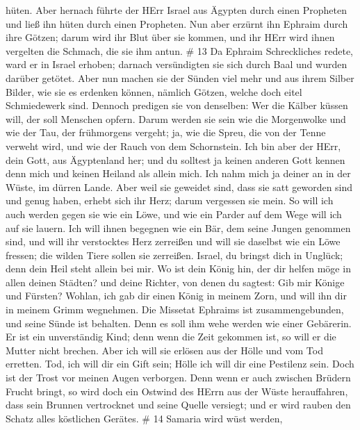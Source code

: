 hüten.  Aber hernach führte der HErr Israel aus Ägypten
durch einen Propheten und ließ ihn hüten durch einen Propheten.
 Nun aber erzürnt ihn Ephraim durch ihre Götzen; darum wird
ihr Blut über sie kommen, und ihr HErr wird ihnen vergelten die Schmach,
die sie ihm antun. \# 13  Da Ephraim Schreckliches redete,
ward er in Israel erhoben; darnach versündigten sie sich durch Baal und
wurden darüber getötet.  Aber nun machen sie der Sünden viel
mehr und aus ihrem Silber Bilder, wie sie es erdenken können, nämlich
Götzen, welche doch eitel Schmiedewerk sind. Dennoch predigen sie von
denselben: Wer die Kälber küssen will, der soll Menschen opfern.
 Darum werden sie sein wie die Morgenwolke und wie der Tau,
der frühmorgens vergeht; ja, wie die Spreu, die von der Tenne verweht
wird, und wie der Rauch von dem Schornstein.  Ich bin aber
der HErr, dein Gott, aus Ägyptenland her; und du solltest ja keinen
anderen Gott kennen denn mich und keinen Heiland als allein mich.
 Ich nahm mich ja deiner an in der Wüste, im dürren Lande.
 Aber weil sie geweidet sind, dass sie satt geworden sind
und genug haben, erhebt sich ihr Herz; darum vergessen sie mein.
 So will ich auch werden gegen sie wie ein Löwe, und wie ein
Parder auf dem Wege will ich auf sie lauern.  Ich will ihnen
begegnen wie ein Bär, dem seine Jungen genommen sind, und will ihr
verstocktes Herz zerreißen und will sie daselbst wie ein Löwe fressen;
die wilden Tiere sollen sie zerreißen.  Israel, du bringst
dich in Unglück; denn dein Heil steht allein bei mir.  Wo
ist dein König hin, der dir helfen möge in allen deinen Städten? und
deine Richter, von denen du sagtest: Gib mir Könige und Fürsten?
 Wohlan, ich gab dir einen König in meinem Zorn, und will
ihn dir in meinem Grimm wegnehmen.  Die Missetat Ephraims
ist zusammengebunden, und seine Sünde ist behalten.  Denn
es soll ihm wehe werden wie einer Gebärerin. Er ist ein unverständig
Kind; denn wenn die Zeit gekommen ist, so will er die Mutter nicht
brechen.  Aber ich will sie erlösen aus der Hölle und vom
Tod erretten. Tod, ich will dir ein Gift sein; Hölle ich will dir eine
Pestilenz sein. Doch ist der Trost vor meinen Augen verborgen.
 Denn wenn er auch zwischen Brüdern Frucht bringt, so wird
doch ein Ostwind des HErrn aus der Wüste herauffahren, dass sein Brunnen
vertrocknet und seine Quelle versiegt; und er wird rauben den Schatz
alles köstlichen Gerätes. \# 14  Samaria wird wüst werden,
